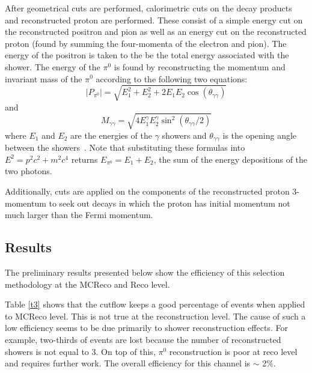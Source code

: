 \documentclass[a4paper, 10pt]{article}
\begin{document}
After geometrical cuts are performed, calorimetric cuts on the decay products and reconstructed proton are performed. These consist of a simple energy cut on the reconstructed positron and pion as well as an energy cut on the reconstructed proton (found by summing the four-momenta of the electron and pion). The energy of the positron is taken to the be the total energy associated with the shower. The energy of the $\pi^{0}$ is found by reconstructing the momentum and invariant mass of the $\pi^{0}$ according to the following two equations:
\begin{equation}
|P_{\pi^{0}}| = \sqrt{E_1^2 + E_2^2 + 2E_1 E_2 \cos(\theta_{\gamma\gamma})}
\end{equation}
and
\begin{equation}
M_{\gamma\gamma} = \sqrt{4E_1^{\gamma} E_2^{\gamma} \sin^2 (\theta_{\gamma\gamma} / 2)}
\end{equation}
where $E_1$ and $E_2$ are the energies of the $\gamma$ showers and $\theta_{\gamma\gamma}$ is the opening angle between the showers~\cite{Acciarri:2014isz}. Note that substituting these formulas into $E^2 = p^2 c^2 + m^2 c^4$ returns $E_{\pi^{0}} = E_1 + E_2$, the sum of the energy depositions of the two photons.

Additionally, cuts are applied on the components of the reconstructed proton 3-momentum to seek out decays in which the proton has initial momentum not much larger than the Fermi momentum.

\subsection{Results}

The preliminary results presented below show the efficiency of this selection methodology at the MCReco and Reco level. 

Table \ref{t3} shows that the cutflow keeps a good percentage of events when applied to MCReco level. This is not true at the reconstruction level. The cause of such a low efficiency seems to be due primarily to shower reconstruction effects. For example, two-thirds of events are lost because the number of reconstructed showers is not equal to 3. On top of this, $\pi^{0}$ reconstruction is poor at reco level and requires further work. The overall efficiency for this channel is $\sim$ 2\%.
\end{document}
